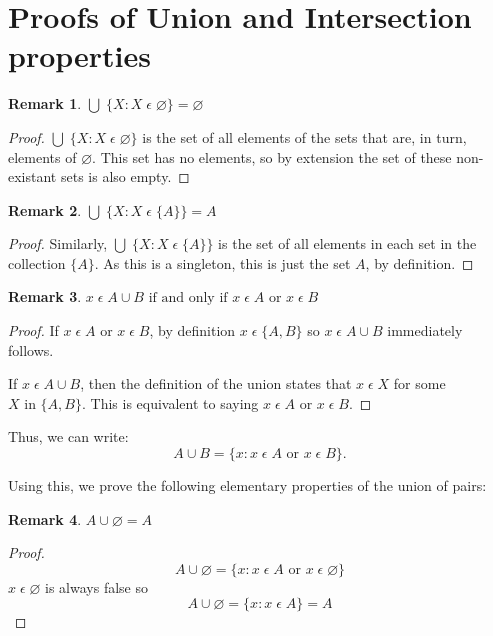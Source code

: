 \documentclass[12pt]{article}
\newtheorem{remark}{Remark}
\begin{document}




\appendix
\section{Proofs of Union and Intersection properties}\label{Appendix: Unions and Intersections proofs}
\begin{remark}
    $\bigcup\;\{X: X\;\epsilon\;\varnothing\} = \varnothing$
\end{remark}
\begin{proof}
    $\bigcup\;\{X: X\;\epsilon\;\varnothing\}$ is the set of all elements of the sets that are, in turn,
    elements of $\varnothing$. This set has no elements, so by extension the set of these non-existant
    sets is also empty.
\end{proof}

\begin{remark}
    $\bigcup\;\{X: X\;\epsilon\;\{A\}\} = A$
\end{remark}
\begin{proof}
    Similarly, $\bigcup\;\{X: X\;\epsilon\;\{A\}\}$ is the set of all elements in each set in the
    collection $\{A\}$. As this is a singleton, this is just the set $A$, by definition.
\end{proof}


\begin{remark}
    $x\;\epsilon\;A \cup B \text{ if and only if } x\;\epsilon\;A \text{ or } x\;\epsilon\;B$
\end{remark}
\begin{proof}
    If $x\;\epsilon\;A \text{ or } x\;\epsilon\;B$, by definition $x\;\epsilon\;\{A, B\}$ so $x\;\epsilon\;A \cup B$
    immediately follows.

    If $x\;\epsilon\;A \cup B$, then the definition of the union states that $x\;\epsilon\;X$ for some
    $X \text{ in } \{A, B\}$. This is equivalent to saying $x\;\epsilon\;A \text{ or } x\;\epsilon\;B$.
\end{proof}

Thus, we can write:
\begin{equation}
    A \cup B = \{x: x\;\epsilon\;A \text{ or } x\;\epsilon\;B\}.
\end{equation}

Using this, we prove the following elementary properties of the union of pairs:
\begin{remark}
    $A \cup\varnothing = A$
\end{remark}
\begin{proof}
    \begin{displaymath}
        A \cup \varnothing = \{x: x\;\epsilon\;A \text{ or } x\;\epsilon\;\varnothing\}
    \end{displaymath}
    $x\;\epsilon\;\varnothing$ is always false so
    \begin{displaymath}
        A \cup \varnothing = \{x: x\;\epsilon\;A\} = A
    \end{displaymath}
\end{proof}
\end{document}
